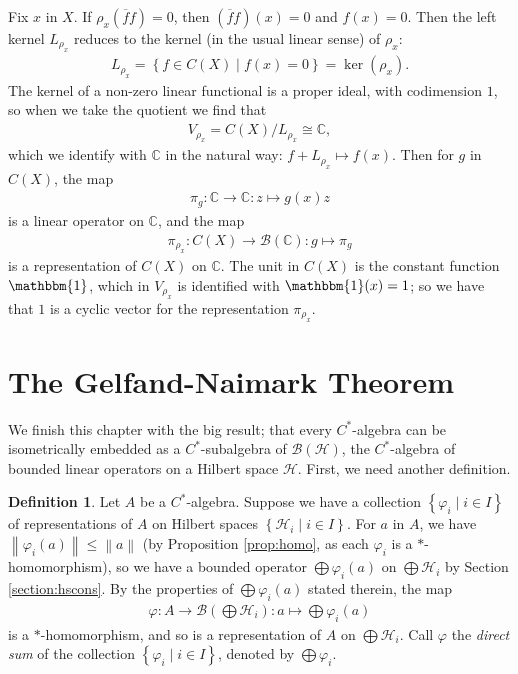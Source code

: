 \documentclass[11pt,a4paper]{report}
\theoremstyle{plain}
\theoremstyle{definition}
\newtheorem{defn}{Definition}
\newcommand{\1}{\mathbbm{1}}
\newcommand{\C}{\mathbb{C}}
\renewcommand{\H}{\mathcal{H}}
\newcommand{\B}{\mathcal{B}}
\newcommand{\BH}{\mathcal{\B(\H)}}
\renewcommand{\phi}{\varphi}
\newcommand{\CX}{C(X)}
\renewcommand{\bar}{\overline}
\renewcommand{\oplus}{\textstyle\bigoplus}
\begin{document}
Fix $x$ in $X$. If $\rho_x(\bar f f)=0$, then $(\bar f f)(x)=0$ and $f(x)=0$. 
Then the left kernel $L_{\rho_x}$ reduces to the kernel (in the usual linear 
sense) of $\rho_x$:
\begin{align*}
	L_{\rho_x} = \left\{f\in\CX \mid f(x) = 0\right\} = \ker(\rho_x).
\end{align*}
The kernel of a non-zero linear functional is a proper ideal, with codimension 
$1$, so when we take the quotient we find that 
\begin{align*}
	V_{\rho_x} = \CX/L_{\rho_x} \cong \C,
\end{align*}
which we identify with $\C$ in the natural way: $f+L_{\rho_x} \mapsto f(x)$.
Then for $g$ in $\CX$, the map 
\begin{align*}
	\pi_g:\C\to\C:z\mapsto g(x)z
\end{align*} 
is a linear operator on $\C$, and the map 
\begin{align*}
	\pi_{\rho_x}:\CX\to\B(\C):g\mapsto\pi_g
\end{align*} 
is a representation of $\CX$ on $\C$. The unit in $\CX$ is the constant function 
$\1$, which in $V_{\rho_x}$ is identified with $\1(x)=1$; so we have that $1$ is 
a cyclic vector for the representation $\pi_{\rho_x}$.
\todo[inline]{do this to a nonpure state on $\CX$}

\section{The Gelfand-Naimark Theorem}\label{section:gn}
We finish this chapter with the big result; that every $C^\ast$-algebra can be 
isometrically embedded as a $C^\ast$-subalgebra of $\BH$, the $C^\ast$-algebra 
of bounded linear operators on a Hilbert space $\H$. First, we need another 
definition.

\begin{defn}
	Let $A$ be a $C^\ast$-algebra. Suppose we have a collection $\left\{\phi_i \mid 
	i\in I\right\}$ of representations of $A$ on Hilbert spaces $\left\{\H_i \mid 
	i\in I\right\}$. For $a$ in $A$, we have $\left\|\phi_i(a)\right\| \leq 
	\left\|a\right\|$ (by Proposition \ref{prop:homo}, as each $\phi_i$ is a 
	$\ast$-homomorphism), so we have a bounded operator $\oplus\phi_i(a)$ on $\oplus 
	\H_i$ by Section \ref{section:hscons}. By the properties of $\oplus\phi_i(a)$ 
	stated therein, the map
	\begin{align*}
		\phi:A\to \B(\oplus\H_i):a\mapsto\oplus\phi_i(a)
	\end{align*}
	is a $\ast$-homomorphism, and so is a representation of $A$ on $\oplus\H_i$. 
	Call $\phi$ the \emph{direct sum} of the collection $\left\{\phi_i \mid i\in 
	I\right\}$, denoted by $\oplus\phi_i$.

\end{defn}
\end{document}

